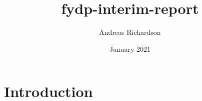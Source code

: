 \documentclass{article}
\title{fydp-interim-report}
\author{Andreas Richardson}
\date{January 2021}
\begin{document}
\maketitle

\section{Introduction}
\end{document}
